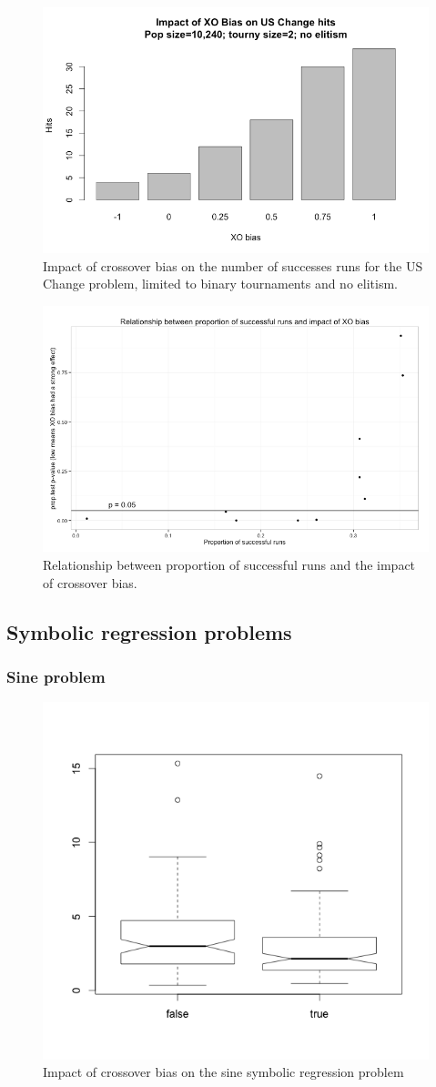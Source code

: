 \documentclass{sig-alternate}
\begin{document}
\begin{figure}
\centering
\includegraphics[width=0.45 \textwidth]{Plots/US_change_successes_tourny2_noElitism.png}
\caption{Impact of crossover bias on the number of successes runs for the US Change problem, limited to binary tournaments and no elitism.}
\label{fig:USChange_Successes}
\end{figure}


\begin{figure}
\centering
\includegraphics[width=0.45 \textwidth]{Plots/US_change_Bias_impact_vs_success.png}
\caption{Relationship between proportion of successful runs and the impact of crossover bias.}
\label{fig:USChangeBiasImpactVsSuccess}
\end{figure}

\subsection{Symbolic regression problems}

\subsubsection{Sine problem}

\begin{figure}
\centering
\includegraphics[width=0.45 \textwidth]{Plots/Sine_bias_results.png}
\caption{Impact of crossover bias on the sine symbolic regression problem}
\label{fig:sineBiasResults}
\end{figure}
\end{document}
